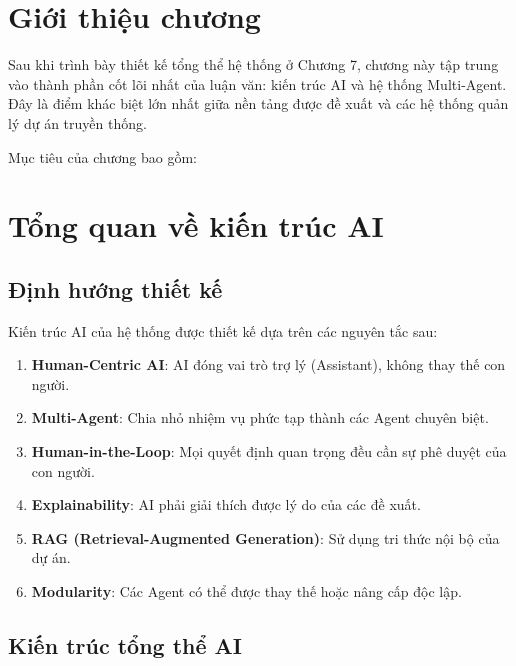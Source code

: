 \documentclass[12pt,a4paper]{report}
\begin{document}
\section{Giới thiệu chương}

Sau khi trình bày thiết kế tổng thể hệ thống ở Chương 7, chương này tập trung vào thành phần cốt lõi nhất của luận văn: kiến trúc AI và hệ thống Multi-Agent. Đây là điểm khác biệt lớn nhất giữa nền tảng được đề xuất và các hệ thống quản lý dự án truyền thống.

Mục tiêu của chương bao gồm:
\section{Tổng quan về kiến trúc AI}

\subsection{Định hướng thiết kế}

Kiến trúc AI của hệ thống được thiết kế dựa trên các nguyên tắc sau:

\begin{enumerate}
\item \textbf{Human-Centric AI}: AI đóng vai trò trợ lý (Assistant), không thay thế con người.
\item \textbf{Multi-Agent}: Chia nhỏ nhiệm vụ phức tạp thành các Agent chuyên biệt.
\item \textbf{Human-in-the-Loop}: Mọi quyết định quan trọng đều cần sự phê duyệt của con người.
\item \textbf{Explainability}: AI phải giải thích được lý do của các đề xuất.
\item \textbf{RAG (Retrieval-Augmented Generation)}: Sử dụng tri thức nội bộ của dự án.
\item \textbf{Modularity}: Các Agent có thể được thay thế hoặc nâng cấp độc lập.
\end{enumerate}

\subsection{Kiến trúc tổng thể AI}
\end{document}
